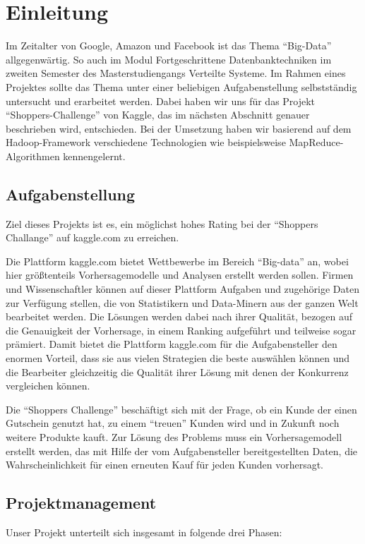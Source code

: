 \section{Einleitung}
Im Zeitalter von Google, Amazon und Facebook ist das Thema "`Big-Data"' allgegenwärtig. So auch im Modul Fortgeschrittene Datenbanktechniken im zweiten Semester des Masterstudiengangs Verteilte Systeme. Im Rahmen eines Projektes sollte das Thema unter einer beliebigen Aufgabenstellung selbstständig untersucht und erarbeitet werden. Dabei haben wir uns für das Projekt "`Shoppers-Challenge"' von Kaggle, das im nächsten Abschnitt genauer beschrieben wird, entschieden. Bei der Umsetzung haben wir basierend auf dem Hadoop-Framework verschiedene Technologien wie beispielsweise MapReduce-Algorithmen kennengelernt.

\subsection{Aufgabenstellung}
Ziel dieses Projekts ist es, ein möglichst hohes Rating bei der "`Shoppers Challange"' auf kaggle.com zu erreichen.

Die Plattform kaggle.com bietet Wettbewerbe im Bereich "`Big-data"' an, wobei hier größtenteils Vorhersagemodelle und Analysen erstellt werden sollen. Firmen und Wissenschaftler können auf dieser Plattform Aufgaben und zugehörige Daten zur Verfügung stellen, die von Statistikern und Data-Minern aus der ganzen Welt bearbeitet werden. Die Lösungen werden dabei nach ihrer Qualität, bezogen auf die Genauigkeit der Vorhersage, in einem Ranking aufgeführt und teilweise sogar prämiert. Damit bietet die Plattform kaggle.com für die Aufgabensteller den enormen Vorteil, dass sie aus vielen Strategien die beste auswählen können und die Bearbeiter gleichzeitig die Qualität ihrer Lösung mit denen der Konkurrenz vergleichen können.

Die "`Shoppers Challenge"' beschäftigt sich mit der Frage, ob ein Kunde der einen Gutschein genutzt hat, zu einem "`treuen"' Kunden wird und in Zukunft noch weitere Produkte kauft. Zur Lösung des Problems muss ein Vorhersagemodell erstellt werden, das mit Hilfe der vom Aufgabensteller bereitgestellten Daten, die Wahrscheinlichkeit für einen erneuten Kauf für jeden Kunden vorhersagt. 

\newpage
\subsection{Projektmanagement}
Unser Projekt unterteilt sich insgesamt in folgende drei Phasen:

